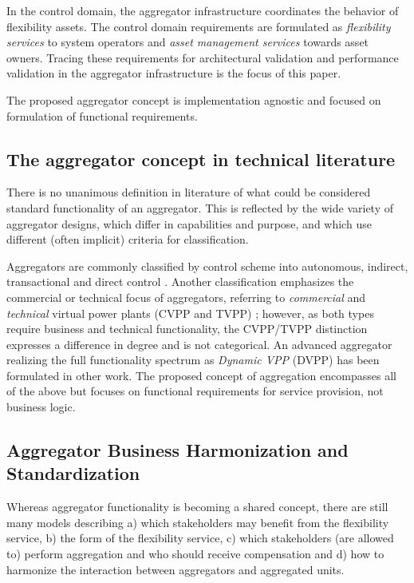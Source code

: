 In the control domain, the aggregator infrastructure coordinates the behavior of flexibility assets. The control domain requirements are formulated as \emph{flexibility services} to system operators and \emph{asset management services} towards asset owners. Tracing these requirements for architectural validation and performance validation in the aggregator infrastructure is the focus of this paper.

The proposed aggregator concept is implementation agnostic and focused on formulation of functional requirements.

\subsection{The aggregator concept in technical literature}
There is no unanimous definition in literature of what could be considered standard functionality of an aggregator. This is reflected by the wide variety of aggregator designs, which differ in capabilities and purpose, and which use different (often implicit) criteria for classification.

Aggregators are commonly classified by control scheme into autonomous, indirect, transactional and direct control . Another classification emphasizes the commercial or technical focus of aggregators, referring to \emph{commercial} and \emph{technical} virtual power plants (CVPP and TVPP) ; however, as both types require business and technical functionality, the CVPP/TVPP distinction expresses a difference in degree and is not categorical. An advanced aggregator realizing the full functionality spectrum as \emph{Dynamic VPP} (DVPP) has been formulated in other work. 
The proposed concept of aggregation encompasses all of the above but focuses on functional requirements for service provision, not business logic.

\subsection{Aggregator Business Harmonization and Standardization}
Whereas aggregator functionality is becoming a shared concept, there are still many models describing a) which stakeholders may benefit from the flexibility service, b) the form of the flexibility service, c) which stakeholders (are allowed to) perform aggregation and who should receive compensation  and d) how to harmonize the interaction between aggregators and aggregated units.

